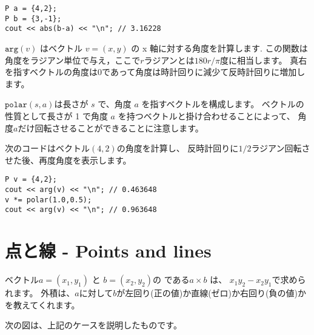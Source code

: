 \begin{lstlisting}
P a = {4,2};
P b = {3,-1};
cout << abs(b-a) << "\n"; // 3.16228
\end{lstlisting}

$\texttt{arg}(v)$ はベクトル $v = (x, y)$ の x 軸に対する角度を計算します.
この関数は角度をラジアン単位で与え，ここで$r$ラジアンとは$180 r/\pi$度に相当します。
真右を指すベクトルの角度は0であって角度は時計回りに減少て反時計回りに増加します。

$\texttt{polar}(s,a)$は長さが $s$ で、角度 $a$ を指すベクトルを構成します。
ベクトルの性質として長さが 1 で角度 $a$ を持つベクトルと掛け合わせることによって、
角度$a$だけ回転させることができることに注意します。

次のコードはベクトル$(4, 2)$の角度を計算し、
反時計回りに$1/2$ラジアン回転させた後、再度角度を表示します。
\begin{lstlisting}
P v = {4,2};
cout << arg(v) << "\n"; // 0.463648
v *= polar(1.0,0.5);
cout << arg(v) << "\n"; // 0.963648
\end{lstlisting}

\section{点と線 - Points and lines}


ベクトル$a=(x_1,y_1)$ と $b=(x_2,y_2)$の
である$a \times b$ は、
$x_1 y_2 - x_2 y_1$で求められます。
外積は、$a$に対して$b$が左回り(正の値)か直線(ゼロ)か右回り(負の値)かを教えてくれます。

次の図は、上記のケースを説明したものです。
\begin{center}
\end{center}

